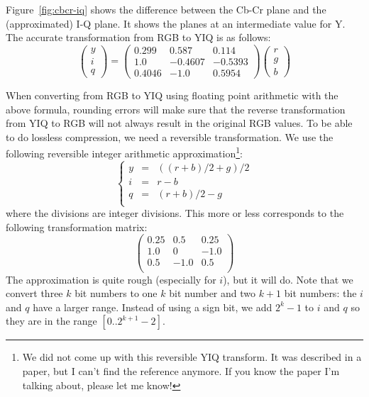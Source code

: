 \documentclass[a4paper,USenglish]{lipics}
\begin{document}
Figure~\ref{fig:cbcr-iq} shows the difference between the Cb-Cr plane and the
(approximated) I-Q plane. It shows the planes at an intermediate value for Y.
The accurate transformation from RGB to YIQ is as follows:
$$
\left(
\begin{array}{c}
y \\ i \\ q
\end{array}
\right)
=
\left(
\begin{array}{ccc}
0.299  & 0.587   & 0.114 \\
1.0    & -0.4607 & -0.5393 \\
0.4046 & -1.0    & 0.5954
\end{array}
\right)
\left(
\begin{array}{c}
r \\ g \\ b
\end{array}
\right)
$$

When converting from RGB to YIQ using floating point arithmetic with the above formula,
rounding errors will make sure that the reverse transformation from YIQ to RGB will not
always result in the original RGB values.
To be able to do lossless compression, we need a reversible transformation.
We use the following reversible integer arithmetic approximation\footnote{We did not come up with this reversible YIQ transform. It was described
in a paper, but I can't find the reference anymore. If you know the paper I'm talking about, please let me know!}:
$$
\left\{
\begin{array}{ccl}
y & = & ((r+b)/2 + g)/2\\
i & = & r-b \\
q & = & (r+b)/2 - g\\
\end{array}
\right.
$$
where the divisions are integer divisions.
This more or less corresponds to the following transformation matrix:
$$
\left(
\begin{array}{ccc}
0.25  & 0.5   & 0.25 \\
1.0   & 0     & -1.0 \\
0.5   & -1.0  & 0.5 \\
\end{array}
\right)
$$
The approximation is quite rough (especially for $i$), but it will do.
Note that we convert three $k$ bit numbers to one $k$ bit number and two $k+1$ bit numbers:
the $i$ and $q$ have a larger range. Instead of using a sign bit, we add $2^k-1$ to $i$ and $q$
so they are in the range $[0..2^{k+1}-2]$.
\end{document}
